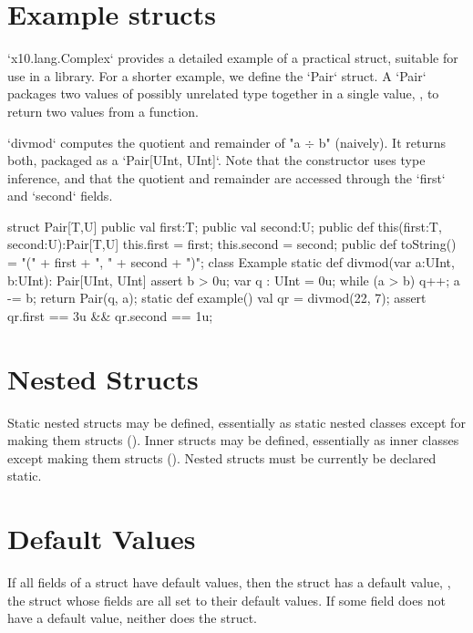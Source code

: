 \section{Example structs}

\xcd`x10.lang.Complex` provides a detailed example of a practical struct,
suitable for use in a library.  For a shorter example, we define the
\xcd`Pair` struct.   A \xcd`Pair` packages
two values of possibly unrelated type together in a single value, \eg, to
return two values from a function.  

\xcd`divmod` computes the quotient and remainder of \xcdmath"a $\div$ b" (naively).
It returns both, packaged as a \xcd`Pair[UInt, UInt]`.  Note that the
constructor uses type inference, and that the quotient and remainder are
accessed through the \xcd`first` and \xcd`second` fields.
\begin{xten}
struct Pair[T,U] {
    public val first:T;
    public val second:U;
    public def this(first:T, second:U):Pair[T,U] {
        this.first = first;
        this.second = second;
    }
    public def toString() 
        = "(" + first + ", " + second + ")";
}
class Example {
  static def divmod(var a:UInt, b:UInt): Pair[UInt, UInt] {
     assert b > 0u;
     var q : UInt = 0u;
     while (a > b) {q++; a -= b;}
     return Pair(q, a); 
  }
  static def example() {
     val qr = divmod(22, 7);
     assert qr.first == 3u && qr.second == 1u;
  }
}
\end{xten}

\section{Nested Structs}

Static nested structs may be defined, essentially as static nested classes
except for making them structs
().  Inner structs may be defined, essentially as
inner classes except making them structs ().
\limitationx{} Nested structs must be currently be declared static.

\section{Default Values}

If all fields of a struct have default values, then the struct has a
default value, \viz, the struct whose fields are all set to their
default values.  If some field does not have a default value, neither
does the struct.

